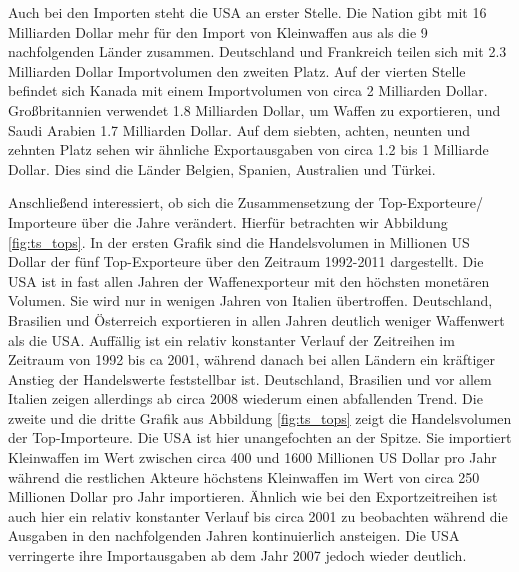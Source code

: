 \documentclass[a4paper,ngerman,oneside,titlepage,bibliography=totoc,11pt]{scrreprt}
\begin{document}
		
Auch bei den Importen steht die USA an erster Stelle. Die Nation gibt mit 16 Milliarden Dollar mehr für den Import von Kleinwaffen aus als die 9 nachfolgenden Länder zusammen. Deutschland und Frankreich teilen sich mit 2.3 Milliarden Dollar Importvolumen den zweiten Platz. Auf der vierten Stelle befindet sich Kanada mit einem Importvolumen von circa 2 Milliarden Dollar. Großbritannien verwendet 1.8 Milliarden Dollar, um Waffen zu exportieren, und Saudi Arabien 1.7 Milliarden Dollar. Auf dem siebten, achten, neunten und zehnten Platz sehen wir ähnliche Exportausgaben von circa 1.2 bis 1 Milliarde Dollar. Dies sind die Länder Belgien, Spanien, Australien und Türkei.

Anschließend interessiert, ob sich die Zusammensetzung der Top-Exporteure/ Importeure über die Jahre verändert. Hierfür betrachten wir Abbildung \ref{fig:ts_tops}. 
In der ersten Grafik sind die Handelsvolumen in Millionen US Dollar der fünf Top-Exporteure über den Zeitraum 1992-2011 dargestellt. Die USA ist in fast allen Jahren der Waffenexporteur mit den höchsten monetären Volumen. Sie wird nur in wenigen Jahren von Italien übertroffen. Deutschland, Brasilien und Österreich exportieren in allen Jahren deutlich weniger Waffenwert als die USA. Auffällig ist ein relativ konstanter Verlauf der Zeitreihen im Zeitraum von 1992 bis ca 2001, während danach bei allen Ländern ein kräftiger Anstieg der Handelswerte feststellbar ist. Deutschland, Brasilien und vor allem Italien zeigen allerdings ab circa 2008 wiederum einen abfallenden Trend.
Die zweite und die dritte Grafik aus Abbildung \ref{fig:ts_tops} zeigt die Handelsvolumen der Top-Importeure. Die USA ist hier unangefochten an der Spitze. Sie importiert Kleinwaffen im Wert zwischen circa 400 und 1600 Millionen US Dollar pro Jahr während die restlichen Akteure höchstens Kleinwaffen im Wert von circa 250 Millionen Dollar pro Jahr importieren. Ähnlich wie bei den Exportzeitreihen ist auch hier ein relativ konstanter Verlauf bis circa 2001 zu beobachten während die Ausgaben in den nachfolgenden Jahren kontinuierlich ansteigen. Die USA verringerte ihre Importausgaben ab dem Jahr 2007 jedoch wieder deutlich. 
\end{document}
